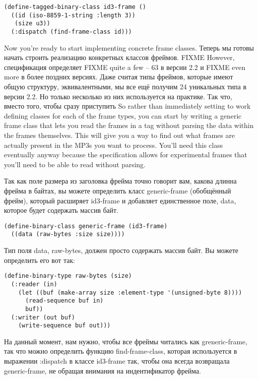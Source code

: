 \begin{lstlisting}
(define-tagged-binary-class id3-frame ()
  ((id (iso-8859-1-string :length 3))
   (size u3))
  (:dispatch (find-frame-class id)))
\end{lstlisting}

Now you're ready to start implementing concrete frame classes.  Теперь мы готовы начать
строить реализацию конкретных классов фреймов.  FIXME However, спецификация определяет
FIXME quite a few -- 63 в версии 2.2 и FIXME even more в более поздних версиях.  Даже
считая типы фреймов, которые имеют общую структуру, эквивалентными, мы все ещё получим 24
уникальных типа в версии 2.2.  Но только несколько из них используется на практике.  Так
что, вместо того, чтобы сразу приступить So rather than immediately setting to work
defining classes for each of the frame types, you can start by writing a generic frame
class that lets you read the frames in a tag without parsing the data within the frames
themselves. This will give you a way to find out what frames are actually present in the
MP3s you want to process. You'll need this class eventually anyway because the
specification allows for experimental frames that you'll need to be able to read without
parsing.

Так как поле размера из заголовка фрейма точно говорит вам, какова длинна фрейма в байтах,
вы можете определить класс generic-frame (обобщённый фрейм), который расширяет id3-frame и
добавляет единственное поле, data, которое будет содержать массив байт.

\begin{lstlisting}
(define-binary-class generic-frame (id3-frame)
  ((data (raw-bytes :size size))))
\end{lstlisting}

Тип поля data, raw-bytes, должен просто содержать массив байт. Вы можете определить его
вот так:

\begin{lstlisting}
(define-binary-type raw-bytes (size)
  (:reader (in)
    (let ((buf (make-array size :element-type '(unsigned-byte 8))))
      (read-sequence buf in)
      buf))
  (:writer (out buf)
    (write-sequence buf out)))
\end{lstlisting}

На данный момент, нам нужно, чтобы все фреймы читались как greneric-frame, так что можно
определить функцию find-frame-class, которая используется в выражении :dispatch в классе
id3-frame так, чтобы она всегда возвращала generic-frame, не обращая внимания на
индентификатор фрейма.

